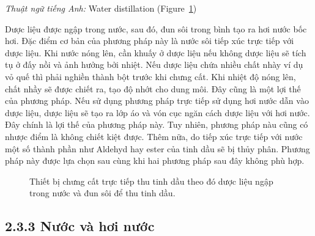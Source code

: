 \documentclass[
  twocolumn,
  landscape]{report}
\begin{document}
\emph{Thuật ngữ tiếng Anh:} Water distillation
(Figure~\ref{fig-WaterDistillation})

Dược liệu được ngập trong nước, sau đó, đun sôi trong bình tạo ra hơi
nước bốc hơi. Đặc điểm cơ bản của phương pháp này là nước sôi tiếp xúc
trực tiếp với dược liệu. Khi nước nóng lên, cần khuấy ở dược liệu nếu
không dược liệu sẽ tích tụ ở đấy nồi và ảnh hưởng bởi nhiệt. Nếu dược
liệu chứa nhiều chất nhày ví dụ vỏ quế thì phải nghiền thành bột trước
khi chưng cất. Khi nhiệt độ nóng lên, chất nhầy sẽ được chiết ra, tạo độ
nhớt cho dung môi. Đây cũng là một lợi thế của phương pháp. Nếu sử dụng
phương pháp trực tiếp sử dụng hơi nước dẫn vào dược liệu, dược liệu sẽ
tạo ra lớp áo và vón cục ngăn cách dược liệu với hơi nước. Đây chính là
lợi thế của phương pháp này. Tuy nhiên, phương pháp nàu cũng có nhược
điểm là không chiết kiệt được. Thêm nữa, do tiếp xúc trực tiếp với nước
một số thành phần như Aldehyd hay ester của tinh dầu sẽ bị thủy phân.
Phương pháp này được lựa chọn sau cùng khi hai phương pháp sau đây không
phù hợp.

\begin{figure}


\caption{\label{fig-WaterDistillation}Thiết bị chưng cất trực tiếp thu
tinh dầu theo đó dược liệu ngập trong nước và đun sôi để thu tinh dầu.}

\end{figure}%

\subsection{2.3.3 Nước và hơi
nước}\label{nux1b0ux1edbc-vuxe0-hux1a1i-nux1b0ux1edbc}
\end{document}
